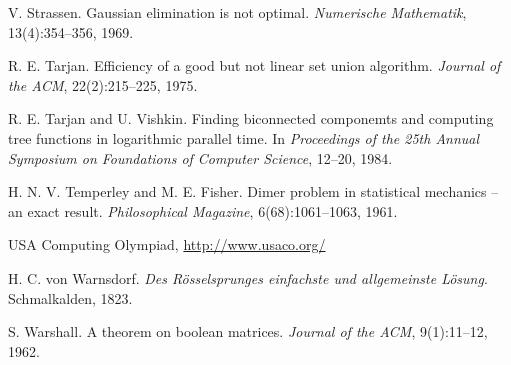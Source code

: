 \begin{thebibliography}{9}
  V. Strassen.
  Gaussian elimination is not optimal.
  \emph{Numerische Mathematik}, 13(4):354--356, 1969.

  R. E. Tarjan.
  Efficiency of a good but not linear set union algorithm.
  \emph{Journal of the ACM}, 22(2):215--225, 1975.

  R. E. Tarjan and U. Vishkin.
  Finding biconnected componemts and computing tree functions in logarithmic parallel time.
  In \emph{Proceedings of the 25th Annual Symposium on Foundations of Computer Science}, 12--20, 1984.

  H. N. V. Temperley and M. E. Fisher.
  Dimer problem in statistical mechanics -- an exact result.
  \emph{Philosophical Magazine}, 6(68):1061--1063, 1961.

  USA Computing Olympiad, \url{http://www.usaco.org/}

  H. C. von Warnsdorf.
  \emph{Des Rösselsprunges einfachste und allgemeinste Lösung}.
  Schmalkalden, 1823.

  S. Warshall.
  A theorem on boolean matrices.
  \emph{Journal of the ACM}, 9(1):11--12, 1962.


\end{thebibliography}
